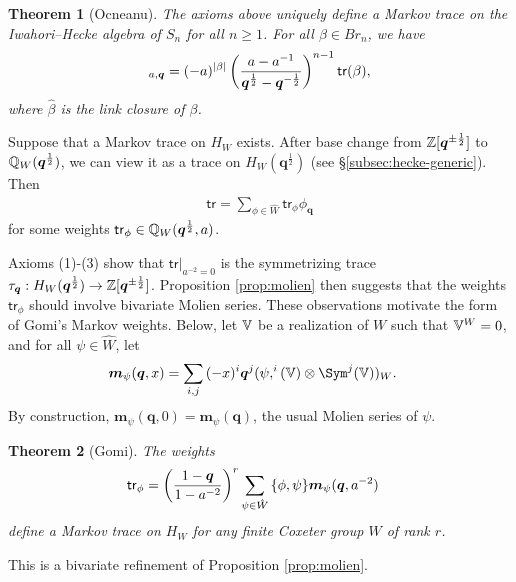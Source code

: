 \documentclass[a4paper,10pt,leqno]{amsart}
\theoremstyle{plain}
\theoremstyle{plain}
\newtheorem{thm}{Theorem}[subsection]
\theoremstyle{plain}
\theoremstyle{definition}
\theoremstyle{remark}
\let\Alt\relax
\DeclareMathOperator{\Alt}{\text{$\Lambda$}}
\newcommand{\Br}{\mathit{Br}}
\newcommand{\Q}{\bm{q}}
\begin{document}
\begin{thm}[Ocneanu]\label{thm:ocneanu}
The axioms above uniquely define a Markov trace on the Iwahori--Hecke algebra of $S_n$ for all $n \geq 1$.
For all $\beta \in \Br_n$, we have
\begin{align}
[\hat{\beta}]_{a, \Q}
=	(-a)^{|\beta|}
	\pa{\frac{a - a^{-1}}{\Q^{\frac{1}{2}} - \Q^{-\frac{1}{2}}}}^{n - 1} 
	\mathsf{tr}(\beta),
\end{align}
where $\hat{\beta}$ is the link closure of $\beta$.
\end{thm}

Suppose that a Markov trace on $H_W$ exists.
After base change from $\bb{Z}[\Q^{\pm\frac{1}{2}}]$ to $\bb{Q}_W(\Q^{\frac{1}{2}})$, we can view it as a trace on $H_W(\Q^{\frac{1}{2}})$ (see \S\ref{subsec:hecke-generic}).
Then
\begin{align}
\mathsf{tr} = \sum_{\phi \in \hat{W}} 
\mathsf{tr}_\phi {\phi_{\Q}}
\end{align}
for some weights $\mathsf{tr}_\phi \in \bb{Q}_W(\Q^{\frac{1}{2}}, a)$.

Axioms (1)-(3) show that $\mathsf{tr}|_{a^{-2} = 0}$ is the symmetrizing trace $\tau_{\Q} : H_W(\Q^{\frac{1}{2}}) \to \bb{Z}[\Q^{\pm\frac{1}{2}}]$.
Proposition \ref{prop:molien} then suggests that the weights $\mathsf{tr}_\phi$ should involve bivariate Molien series.
These observations motivate the form of Gomi's Markov weights.
Below, let $\mathbb{V}$ be a realization of $W$ such that $\mathbb{V}^W = 0$, and for all $\psi \in \hat{W}$, let
\begin{align}\begin{split}
\bm{m}_\psi(\Q, x)
&=	\sum_{i, j}
	{(-x)^i} \Q^j
	(\psi, \Alt^i(\bb{V}) \otimes \Sym^j(\bb{V}))_W.
\end{split}\end{align}
By construction, $\bm{m}_\psi(\Q, 0) = \bm{m}_\psi(\Q)$, the usual Molien series of $\psi$.

\begin{thm}[Gomi]\label{thm:gomi}
The weights
\begin{align}\begin{split}
\mathsf{tr}_\phi
&=	\pa{\frac{1 - \Q}{1 - a^{-2}}}^{r}
	\sum_{\psi \in \hat{W}}
	{\{\phi, \psi\}}
	\bm{m}_\psi(\Q, a^{-2})
\end{split}\end{align}
define a Markov trace on $H_W$ for any finite Coxeter group $W$ of rank $r$.
\end{thm}

This is a bivariate refinement of Proposition \ref{prop:molien}.
\end{document}
